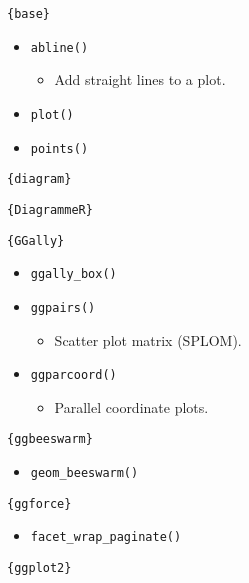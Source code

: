 \documentclass[
]{book}
\providecommand{\tightlist}{%
  \setlength{\itemsep}{0pt}\setlength{\parskip}{0pt}}
\begin{document}
\texttt{\{base\}}

\begin{itemize}
\tightlist
\item
  \texttt{abline()}

  \begin{itemize}
  \tightlist
  \item
    Add straight lines to a plot.
  \end{itemize}
\item
  \texttt{plot()}
\item
  \texttt{points()}
\end{itemize}

\texttt{\{diagram\}}

\texttt{\{DiagrammeR\}}

\texttt{\{GGally\}}

\begin{itemize}
\tightlist
\item
  \texttt{ggally\_box()}
\item
  \texttt{ggpairs()}

  \begin{itemize}
  \tightlist
  \item
    Scatter plot matrix (SPLOM).
  \end{itemize}
\item
  \texttt{ggparcoord()}

  \begin{itemize}
  \tightlist
  \item
    Parallel coordinate plots.
  \end{itemize}
\end{itemize}

\texttt{\{ggbeeswarm\}}

\begin{itemize}
\tightlist
\item
  \texttt{geom\_beeswarm()}
\end{itemize}

\texttt{\{ggforce\}}

\begin{itemize}
\tightlist
\item
  \texttt{facet\_wrap\_paginate()}
\end{itemize}

\texttt{\{ggplot2\}}
\end{document}
